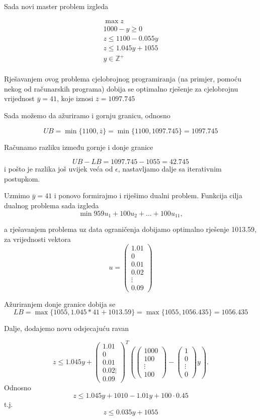 \documentclass[a4paper, utf8, 11pt, colorlinks]{book}
\theoremstyle{definition}
\begin{document}
Sada novi master problem izgleda 


$$
\begin{aligned}
	\max z\\
	1000-y\geqslant 0\\
	z\leqslant 1100-0.055y\\ 
	z\leqslant 1.045y+1055\\
	y\in\mathbb{Z}^+\\	
\end{aligned}
$$


Rješavanjem ovog problema cjelobrojnog programiranja (na primjer, pomoću nekog od računarskih programa) dobija se optimalno rješenje za cjelobrojnu vrijednost $\overline{y}=41$, koje iznosi $\overline{z} = 1097.745$

Sada možemo da ažuriramo i gornju granicu, odnosno 

$$UB = \min\{1100,\overline{z}\} =  \min\{1100,1097.745\} =1097.745$$

Računamo razliku između gornje i donje granice

$$UB-LB=1097.745-1055 = 42.745$$
i pošto je razlika još uvijek veća od $\epsilon$, nastavljamo dalje sa iterativnim postupkom.

Uzmimo $\overline{y}=41$ i ponovo formirajmo i riješimo dualni problem. 
Funkcija cilja dualnog problema sada izgleda 
$$\min 959u_1+ 100u_2+\ldots+100u_{11},$$

a rješavanjem problema uz data ograničenja dobijamo optimalno rješenje 1013.59, za vrijednosti vektora 
$$u=\left(\begin{array}{c}
	1.01 \\
	0 \\
	0.01\\
	0.02\\
	\vdots \\
	0.09
\end{array}\right)$$

Ažuriranjem donje granice dobija se 
$$LB = \max\{1055,1.045*41+1013.59\} = \max\{1055,1056.435\} = 1056.435 $$

Dalje, dodajemo novu odsjecajuću ravan

$$z\leqslant 1.045y+\left(\begin{array}{c}
	1.01 \\
	0 \\
	0.01\\
	0.02
	\vdots \\
	0.09
\end{array}\right)^T
\left(\left(\begin{array}{c}
	1000 \\
	100 \\
	\vdots \\
	100
\end{array}\right)-\left(\begin{array}{c}
	1 \\
	0 \\
	\vdots \\
	0
\end{array}\right)y\right).$$
Odnosno 
$$z\leqslant 1.045y+1010-1.01y+100\cdot0.45$$
t.j.
$$z\leqslant 0.035y+1055$$
\end{document}
